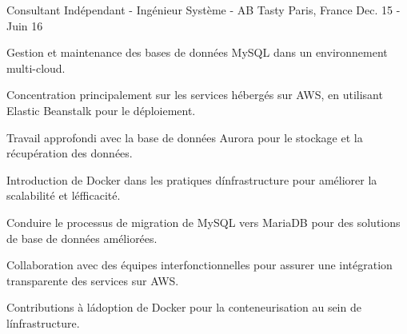 \begin{cventries}
\cventry
{Consultant Indépendant - Ingénieur Système - } %
{AB Tasty} %
{Paris, France} %
{Dec. 15 - Juin 16} %
{
  \begin{cvitems} %
    \item {Gestion et maintenance des bases de données MySQL dans un environnement multi-cloud.}
    \item {Concentration principalement sur les services hébergés sur AWS, en utilisant Elastic Beanstalk pour le déploiement.}
    \item {Travail approfondi avec la base de données Aurora pour le stockage et la récupération des données.}
    \item {Introduction de Docker dans les pratiques d\' infrastructure pour améliorer la scalabilité et l\' efficacité.}
    \item {Conduire le processus de migration de MySQL vers MariaDB pour des solutions de base de données améliorées.}
    \item {Collaboration avec des équipes interfonctionnelles pour assurer une intégration transparente des services sur AWS.}
    \item {Contributions à l\' adoption de Docker pour la conteneurisation au sein de l\' infrastructure.}
  \end{cvitems}
}


\end{cventries}


